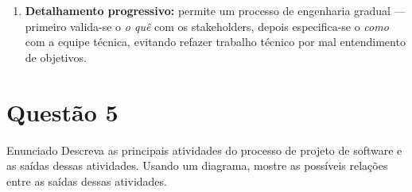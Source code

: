 \documentclass[12pt,a4paper]{article}
\begin{document}
\begin{resposta}
\begin{enumerate}
  \item \textbf{Detalhamento progressivo:} permite um processo de engenharia
        gradual — primeiro valida-se o \emph{o quê} com os stakeholders, depois
        especifica-se o \emph{como} com a equipe técnica, evitando refazer trabalho
        técnico por mal entendimento de objetivos.
\end{enumerate}

\end{resposta}

\section*{Questão 5}

\begin{questao}{Enunciado}
Descreva as principais atividades do processo de projeto de software e as
saídas dessas atividades. Usando um diagrama, mostre as possíveis relações
entre as saídas dessas atividades.
\end{questao}
\end{document}
